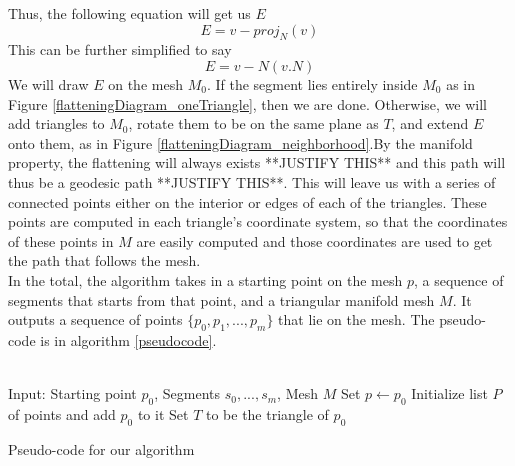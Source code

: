 \documentclass[conference]{acmsiggraph}
\begin{document}
Thus, the following equation will get us $E$
\[
E = v - proj_N(v)
\]
This can be further simplified to say
\[
E = v - N(v.N)
\]
We will draw $E$ on the mesh $M_0$. If the segment lies entirely inside $M_0$ as in Figure \ref{flatteningDiagram_oneTriangle}, then we are done. Otherwise, we will add triangles to $M_0$, rotate them to be on the same plane as $T$, and extend $E$ onto them, as in Figure \ref{flatteningDiagram_neighborhood}.By the manifold property, the flattening will always exists **JUSTIFY THIS** and this path will thus be a geodesic path **JUSTIFY THIS**. This will leave us with a series of connected points either on the interior or edges of each of the triangles. These points are computed in each triangle's coordinate system, so that the coordinates of these points in $M$ are easily computed and those coordinates are used to get the path that follows the mesh.\\
In the total, the algorithm takes in a starting point on the mesh $p$, a sequence of segments that starts from that point, and a triangular manifold mesh $M$. It outputs a sequence of points $\{ p_0, p_1, ... , p_m\}$ that lie on the mesh. The pseudo-code is in algorithm \ref{pseudocode}.\\
\\
\begin{algorithm}[t]
Input: Starting point $p_0$, Segments $s_0,...,s_m$, Mesh $M$\;
Set $p \leftarrow p_0$ \;
Initialize list $P$ of points and add $p_0$ to it \;
Set $T$ to be the triangle of $p_0$ \;
\caption{Pseudo-code for our algorithm}
\label{pseudocode}
\end{algorithm}
\end{document}
